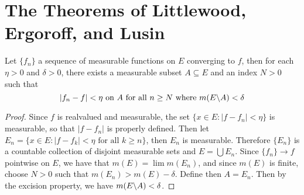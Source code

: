 \section{The Theorems of Littlewood, Ergoroff, and Lusin}

\begin{lemma}\label{.9.3.1}
    Let $\{f_n\}$ a sequence of measurable functions on $E$ converging to  $f$,
    then for each $\eta>0$ and  $\delta>0$, there exists a measurable subset  $A
    \subseteq E$ and an index $N>0$ such that
    \begin{equation*}
        |f_n-f|<\eta \text{ on } A \text{ for all } n \geq N \text{ where }
        m(E \backslash A)<\delta
    \end{equation*}
\end{lemma}
\begin{proof}
    Since $f$ is realvalued and measurable, the set $\{x \in E : |f-f_n|<\eta\}$
    is measurable, so that $|f-f_n|$ is properly defined. Then let $E_n=\{x \in
    E : |f-f_k|<\eta \text{ for all } k \geq n\}$, then $E_n$ is measurable.
    Therefore  $\{E_n\}$ is a countable collection of disjoint measurable sets
    and $E=\bigcup{E_n}$. Since $\{f_n\} \xrightarrow{} f$ pointwise on $E$, we
    have that  $m(E)=\lim{m(E_n)}$, and since $m(E)$ is finite, choose $N>0$
    such that  $m(E_n)>m(E)-\delta$. Define then $A=E_n$. Then by the excision
    property, we have $m(E \backslash A)<\delta$.
\end{proof}

